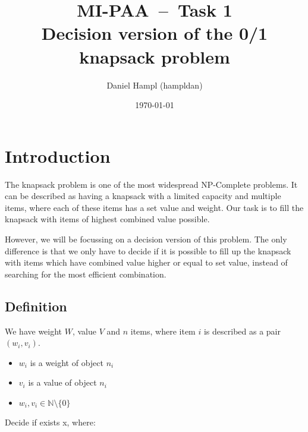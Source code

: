 
\RequirePackage{todonotes}
\RequirePackage[parfill]{parskip}
\RequirePackage[margin=2.8cm]{geometry}
\RequirePackage{hyperref}
\RequirePackage[english]{babel}
\RequirePackage{pgfplots}
\RequirePackage{listings}
\RequirePackage{amsfonts}

\providecommand{\tightlist}{%
  \setlength{\itemsep}{0pt}\setlength{\parskip}{0pt}}


\title{\textbf{MI-PAA~--~Task 1}\\
    Decision version of the 0/1 knapsack problem}
\author{Daniel Hampl (hampldan)}
\date{\today}
\maketitle

\tableofcontents
\newpage

\section{Introduction}
The knapsack problem is one of the most widespread NP-Complete problems. It can be described as having a knapsack with a limited capacity and multiple items, where each of these items has a set value and weight. Our task is to fill the knapsack with items of highest combined value possible.

However, we will be focussing on a decision version of this problem. The only difference is that we only have to decide if it is possible to fill up the knapsack with items which have combined value higher or equal to set value, instead of searching for the most efficient combination.

\subsection{Definition\cite{WEBSITE:knapsackDef}}
We have weight $W$, value $V$ and $n$ items, where item $i$ is described as a pair $(w_i, v_i)$.

\begin{itemize}
    \item $w_i$ is a weight of object $n_i$
    \item $v_i$ is a value of object $n_i$
    \item $w_i, v_i \in \mathbb{N}\setminus\{0\}$
\end{itemize}

Decide if exists x, where:

